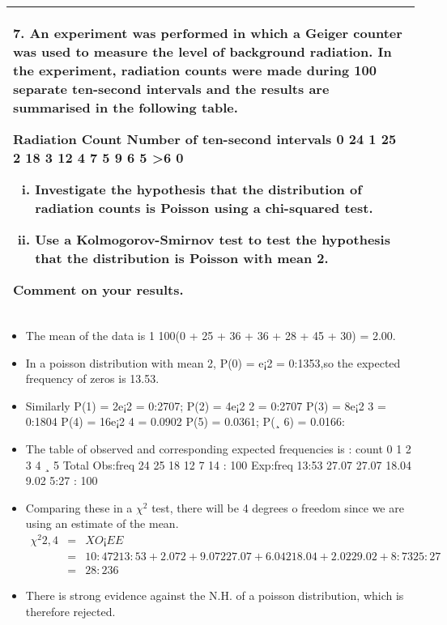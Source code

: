 \documentclass[a4paper,12pt]{article}
\begin{document}
\begin{table}[ht!]
     

\centering
     

\begin{tabular}{|p{15cm}|}
     

\hline 
\large
 
7. An experiment was performed in which a Geiger counter was used to measure the level of background radiation.  In the experiment, radiation counts were made during 100 separate ten-second intervals and the results are summarised in the following table. 
 
Radiation Count Number of ten-second intervals 0 24 1 25 2 18 3 12 4 7 5 9 6 5 >6 0 
 
\begin{enumerate}[(i)] 
\item Investigate the hypothesis that the distribution of radiation counts is Poisson using a chi-squared test.  
\item  Use a Kolmogorov-Smirnov test to test the hypothesis that the distribution is Poisson with mean 2.  
\end{enumerate}
Comment on your results. 

\\ \hline


\end{tabular}
    

\end{table}

\begin{itemize}
    \item 
The mean of the data is 1
100(0 + 25 + 36 + 36 + 28 + 45 + 30) = 2.00. 

\item In a
poisson distribution with mean 2, P(0) = e¡2 = 0:1353,so the expected frequency of
zeros is 13.53.


\item Similarly P(1) = 2e¡2 = 0:2707; P(2) = 4e¡2
2 = 0:2707 P(3) = 8e¡2
3 =
0:1804 P(4) = 16e¡2
4 = 0.0902 P(5) = 0.0361; P(¸ 6) = 0.0166: 
\item The table of observed
and corresponding expected frequencies is :
count 0 1 2 3 4 ¸ 5 Total
Obs:freq 24 25 18 12 7 14 : 100
Exp:freq 13:53 27.07 27.07 18.04 9.02 5:27 : 100
\item Comparing these in a $\chi^2$ test, there will be 4 degrees o freedom since we are using an
estimate of the mean.
\begin{eqnarray*}
\chi^2{2,4}
&=&
XO ¡ E
E
\\ &=& 
10:472
13:53
+
2.072 + 9.072
27.07
+
6.042
18.04
+
2.022
9.02
+
8:732
5:27
\\ &=& 28:236
\end{eqnarray*}
\item There is strong evidence against the N.H. of a poisson distribution, which is therefore
rejected.
\end{itemize}
\end{document}
